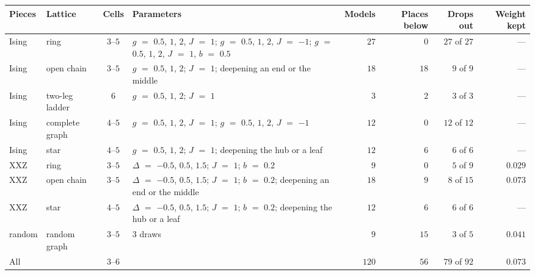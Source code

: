 \begin{tabular}{llcp{2.45in}rrrr}
\toprule
Pieces & Lattice & Cells & Parameters & Models & Places below & Drops out & Weight kept \tabularnewline
\midrule
Ising & ring & $3$--$5$ & $g$ $=$ $0.5$, $1$, $2$, $J$ $=$ $1$; $g$ $=$ $0.5$, $1$, $2$, $J$ $=$ $-1$; $g$ $=$ $0.5$, $1$, $2$, $J$ $=$ $1$, $b$ $=$ $0.5$ & $27$ & $0$ & $27$ of $27$ & --- \tabularnewline
Ising & open chain & $3$--$5$ & $g$ $=$ $0.5$, $1$, $2$; $J$ $=$ $1$; deepening an end or the middle & $18$ & $18$ & $9$ of $9$ & --- \tabularnewline
Ising & two-leg ladder & $6$ & $g$ $=$ $0.5$, $1$, $2$; $J$ $=$ $1$ & $3$ & $2$ & $3$ of $3$ & --- \tabularnewline
Ising & complete graph & $4$--$5$ & $g$ $=$ $0.5$, $1$, $2$, $J$ $=$ $1$; $g$ $=$ $0.5$, $1$, $2$, $J$ $=$ $-1$ & $12$ & $0$ & $12$ of $12$ & --- \tabularnewline
Ising & star & $4$--$5$ & $g$ $=$ $0.5$, $1$, $2$; $J$ $=$ $1$; deepening the hub or a leaf & $12$ & $6$ & $6$ of $6$ & --- \tabularnewline
XXZ & ring & $3$--$5$ & $\Delta$ $=$ $-0.5$, $0.5$, $1.5$; $J$ $=$ $1$; $b$ $=$ $0.2$ & $9$ & $0$ & $5$ of $9$ & $0.029$ \tabularnewline
XXZ & open chain & $3$--$5$ & $\Delta$ $=$ $-0.5$, $0.5$, $1.5$; $J$ $=$ $1$; $b$ $=$ $0.2$; deepening an end or the middle & $18$ & $9$ & $8$ of $15$ & $0.073$ \tabularnewline
XXZ & star & $4$--$5$ & $\Delta$ $=$ $-0.5$, $0.5$, $1.5$; $J$ $=$ $1$; $b$ $=$ $0.2$; deepening the hub or a leaf & $12$ & $6$ & $6$ of $6$ & --- \tabularnewline
random & random graph & $3$--$5$ & $3$ draws & $9$ & $15$ & $3$ of $5$ & $0.041$ \tabularnewline
\midrule
All &  & $3$--$6$ &  & $120$ & $56$ & $79$ of $92$ & $0.073$ \tabularnewline
\bottomrule
\end{tabular}
